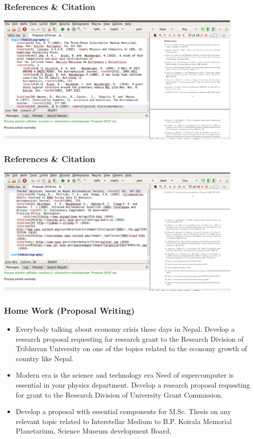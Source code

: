 \documentclass{beamer}
\begin{document}
\begin{frame}
\frametitle{\bf References \& Citation}
\includegraphics[width=12cm]{RE}
\end{frame}
\begin{frame}
\frametitle{\bf References \& Citation}
\includegraphics[width=12cm]{RE1}
\end{frame}

\begin{frame}
\frametitle{\bf Home Work (Proposal Writing)}
\begin{itemize}
	\bf
	\item \color{red}Everybody talking about economy crisis these days in
	Nepal. Develop a research proposal requesting for research grant
	to the Research Division of Tribhuvan University on one of the
	topics related to the economy growth of country like Nepal.
	\item \color{blue} Modern era is the science and technology era Need of
	supercomputer is essential in your physics department.
	Develop a research proposal requesting for grant to the
	Research Division of University Grant Commission.
	\item  \color{red} Develop a proposal with essential components for M.Sc.
	Thesis on any relevant topic related to Interstellar Medium to B.P.
	Koirala Memorial Planetarium, Science Museum development Board,
\end{itemize}
\end{frame}
\end{document}
